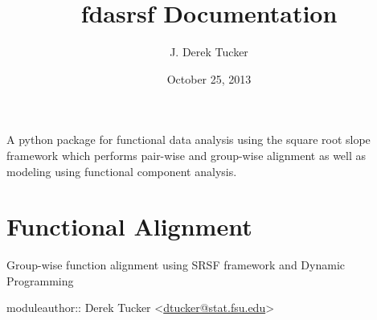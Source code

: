 \documentclass[letterpaper,10pt,english]{sphinxmanual}
\title{fdasrsf Documentation}
\date{October 25, 2013}
\author{J. Derek Tucker}
\begin{document}
\maketitle
\tableofcontents
{}\label{index::doc}


A python package for functional data analysis using the square root slope framework which performs pair-wise and
group-wise alignment as well as modeling using functional component analysis.


\chapter{Functional Alignment}
\label{time_warping::doc}\label{time_warping:welcome-to-fdasrsf-s-documentation}\label{time_warping:module-time_warping}\label{time_warping:functional-alignment}
Group-wise function alignment using SRSF framework and Dynamic Programming

moduleauthor:: Derek Tucker \textless{}\href{mailto:dtucker@stat.fsu.edu}{dtucker@stat.fsu.edu}\textgreater{}
\end{document}
